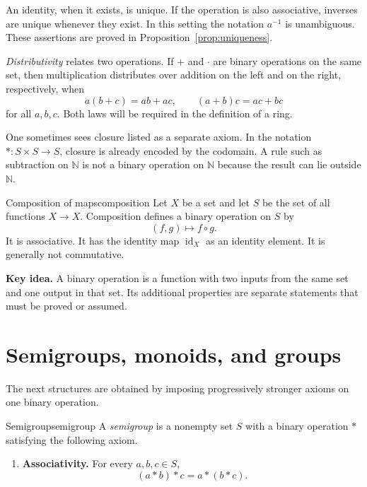 \documentclass[10pt,a4paper]{article}
\newcommand{\N}{\mathbb{N}}
\newcommand{\keyidea}[1]{%
  \par\smallskip
  \begin{minipage}{\linewidth}
  \noindent\textbf{\color{vuBurgundy}Key idea.} #1
  \end{minipage}
  \par\smallskip
}
\begin{document}
An identity, when it exists, is unique. If the operation
is also associative, inverses are unique whenever they exist. In this
setting the notation $a^{-1}$ is unambiguous. These assertions are proved in Proposition~\ref{prop:uniqueness}.

\emph{Distributivity} relates two operations. If $+$ and $\cdot$ are binary
operations on the same set, then multiplication distributes over addition on
the left and on the right, respectively, when
\[
  a(b+c)=ab+ac,
  \qquad
  (a+b)c=ac+bc
\]
for all $a,b,c$. Both laws will be required in the definition of a ring.

\begin{precision}
One sometimes sees closure listed as a separate axiom. In the notation
$\ast:S\times S\to S$, closure is already encoded by the codomain. A rule
such as subtraction on $\N$ is not a binary operation on $\N$ because the
result can lie outside $\N$.
\end{precision}

\begin{examplebox}{Composition of maps}{composition}
Let $X$ be a set and let $S$ be the set of all functions $X\to X$. Composition
defines a binary operation on $S$ by
\[
  (f,g)\longmapsto f\circ g.
\]
It is associative. It has the identity map $\operatorname{id}_X$ as an
identity element. It is generally not commutative.
\end{examplebox}

\keyidea{A binary operation is a function with two inputs from the same set
and one output in that set. Its additional properties are separate statements
that must be proved or assumed.}

\section{Semigroups, monoids, and groups}

The next structures are obtained by imposing progressively stronger axioms on
one binary operation.

\begin{definition}{Semigroup}{semigroup}
A \emph{semigroup} is a nonempty set $S$ with a binary operation $\ast$ satisfying
the following axiom.
\begin{enumerate}[label=\textup{(S\arabic*)}]
  \item \textbf{Associativity.} For every $a,b,c\in S$,
  \[
    (a\ast b)\ast c=a\ast(b\ast c).
  \]
\end{enumerate}
\end{definition}
\end{document}
